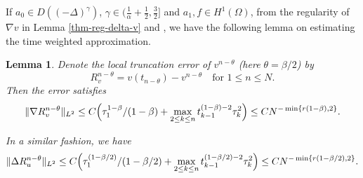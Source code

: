 \documentclass[11pt]{article}
\newtheorem{lemma}{Lemma}[section]
\numberwithin{equation}{section}
\begin{document}
If $a_0\in D((-\Delta)^{\gamma})$, $\gamma\in(\frac{1}{\alpha}+\frac12,\frac32]$ and $a_1,f\in H^1(\Omega)$, from the regularity of $\nabla v$ in Lemma \ref{thm-reg-delta-v} and \cite[Lemma 3.8 and Theorem 3.9]{LiaoH2021L2_1}, we have the following lemma on estimating
the time weighted approximation.
\begin{lemma}\label{lem-nabla-v}
    Denote the local truncation error of $v^{n-\theta}$ (here $\theta=\beta/2$) by
    \[
    R_v^{n-\theta}=v(t_{n-\theta})-v^{n-\theta}\quad\text{for }1\leq n\leq N.
    \]
    Then the error satisfies
    \[
    \|\nabla R_v^{n-\theta}\|_{L^2}\leq C\Bigl(\tau_{1}^{1-\beta}/(1-\beta)+\max_{2\leq k\leq n}t_{k-1}^{(1-\beta)-2}\tau_{k}^{2}\Bigr)\leq CN^{-\min\{r(1-\beta),2\}}.
    \]
    
    In a similar fashion, we have
    \[     \|\Delta R_u^{n-\theta}\|_{L^2}\leq C\Bigl(\tau_{1}^{(1-\beta/2)}/(1-\beta/2)+\max_{2\leq k\leq n}t_{k-1}^{(1-\beta/2)-2}\tau_{k}^{2}\Bigr)\leq CN^{-\min\{r(1-\beta/2),2\}}.     \]
\end{lemma}

\end{document}

